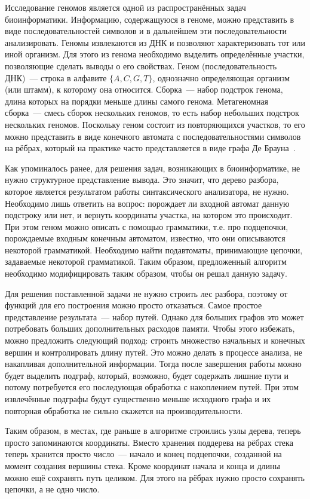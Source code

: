 Исследование геномов является одной из распространённых задач биоинформатики. Информацию, содержащуюся в геноме, можно представить в виде последовательностей символов и в дальнейшем эти последовательности анализировать. Геномы извлекаются из ДНК и позволяют характеризовать тот или иной организм. Для этого из генома необходимо выделить определённые участки, позволяющие сделать выводы о его свойствах. Геном (последовательность ДНК)~--- строка в алфавите $\{A, C, G, T\}$, однозначно определяющая организм (или штамм), к которому она относится. Сборка~--- набор подстрок генома, длина которых на порядки меньше длины самого генома. Метагеномная сборка~--- смесь сборок нескольких геномов, то есть набор небольших подстрок нескольких геномов. Поскольку геном состоит из повторяющихся участков, то его можно представить в виде конечного автомата с последовательностями символов на рёбрах, который на практике часто представляется в виде графа  Де Брауна~\cite{Bruijn}.

Как упоминалось ранее, для решения задач, возникающих в биоинформатике, не нужно структурное представление вывода. Это значит, что дерево разбора, которое является результатом работы синтаксического анализатора, не нужно. Необходимо лишь ответить на вопрос: порождает ли входной автомат данную подстроку или нет, и вернуть координаты участка, на котором это происходит. При этом геном можно описать с помощью грамматики, т.е. про подцепочки, порождаемые входным конечным автоматом, известно, что они описываются некоторой грамматикой. Необходимо найти подавтоматы, принимающие цепочки, задаваемые некоторой грамматикой. Таким образом, предложенный алгоритм необходимо модифицировать таким образом, чтобы он решал данную задачу. 

Для решения поставленной задачи не нужно строить лес разбора, поэтому от функций для его построения можно просто отказаться. Самое простое представление результата~--- набор путей. Однако для больших графов это может потребовать больших дополнительных расходов памяти. Чтобы этого избежать, можно предложить следующий подход: строить множество начальных и конечных вершин и контролировать длину путей. Это можно делать в процессе анализа, не накапливая дополнительной информации. Тогда после завершения работы можно будет выделить подграф, который, возможно, будет содержать лишние пути и потому потребуется его последующая обработка с накоплением путей. При этом извлечённые подграфы будут существенно меньше исходного графа и их повторная обработка не сильно скажется на производительности.

Таким образом, в местах, где раньше в алгоритме строились узлы дерева, теперь просто запоминаются координаты. Вместо хранения поддерева на рёбрах стека теперь хранится просто число~--- начало и конец подцепочки, созданной на момент создания вершины стека. Кроме координат начала и конца и длины можно ещё сохранять путь целиком. Для этого на рёбрах нужно просто сохранять цепочки, а не одно число. 
